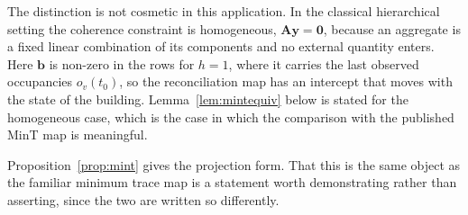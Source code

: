 \documentclass[utf8]{FrontiersinHarvard}
\newif\ifrevisionmarkup
\newcommand{\new}[1]{\ifrevisionmarkup\textcolor{revision}{#1}\else#1\fi}
\theoremstyle{plain}
\theoremstyle{definition}
\theoremstyle{remark}
\newcommand{\bA}{\bm{A}}
\newcommand{\by}{\bm{y}}
\newcommand{\bb}{\bm{b}}
\begin{document}
\new{The distinction is not cosmetic in this application. In the classical hierarchical setting the coherence constraint is homogeneous, $\bA\by=\bm{0}$, because an aggregate is a fixed linear combination of its components and no external quantity enters. Here $\bb$ is non-zero in the rows for $h=1$, where it carries the last observed occupancies $o_v(t_0)$, so the reconciliation map has an intercept that moves with the state of the building. Lemma~\ref{lem:mintequiv} below is stated for the homogeneous case, which is the case in which the comparison with the published MinT map is meaningful.}

Proposition~\ref{prop:mint} gives the projection form. That this is the same object as the familiar minimum trace map is a statement worth demonstrating rather than asserting, since the two are written so differently.
\end{document}
